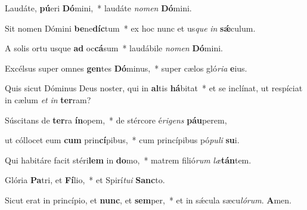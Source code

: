 \item Laudáte, \textbf{pú}eri \textbf{Dó}mini,~* laudáte \textit{no}\textit{men} \textbf{Dó}mini.

\item Sit nomen Dómini \textbf{be}ne\textbf{díc}tum~* ex hoc nunc et us\textit{que} \textit{in} \textbf{sǽ}culum.

\item A solis ortu usque \textbf{ad} oc\textbf{cá}sum~* laudábile \textit{no}\textit{men} \textbf{Dó}mini.

\item Excélsus super omnes \textbf{gen}tes \textbf{Dó}minus,~* super cælos gló\textit{ri}\textit{a} \textbf{e}ius.

\item Quis sicut Dóminus Deus noster, qui in \textbf{al}tis \textbf{há}bitat~* et se inclínat, ut respíciat in cælum \textit{et} \textit{in} \textbf{ter}ram?

\item Súscitans de \textbf{ter}ra \textbf{ín}opem,~* de stércore é\textit{ri}\textit{gens} \textbf{páu}perem,

\item ut cóllocet eum \textbf{cum} prin\textbf{cí}pibus,~* cum princípibus pó\textit{pu}\textit{li} \textbf{su}i.

\item Qui habitáre facit stéri\textbf{lem} in \textbf{do}mo,~* matrem filió\textit{rum} \textit{læ}\textbf{tán}tem.

\item Glória \textbf{Pa}tri, et \textbf{Fí}lio,~* et Spirí\textit{tu}\textit{i} \textbf{Sanc}to.

\item Sicut erat in princípio, et \textbf{nunc}, et \textbf{sem}per,~* et in sǽcula sæcu\textit{ló}\textit{rum}. \textbf{A}men.